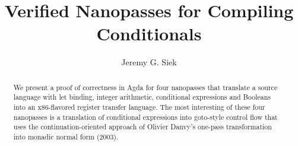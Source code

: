 \documentclass[sigplan,review,dvipsnames,screen,10pt]{acmart}
\begin{document}
\title{Verified Nanopasses for Compiling Conditionals}

\author{Jeremy G. Siek}


\begin{abstract}
We present a proof of correctness in Agda for four nanopasses that
translate a source language with let binding, integer arithmetic,
conditional expressions and Booleans into an x86-flavored register
transfer language. The most interesting of these four nanopasses is a
translation of conditional expressions into goto-style control flow
that uses the continuation-oriented approach of Olivier Danvy's
one-pass transformation into monadic normal form (2003).
\end{abstract}

\end{document}

